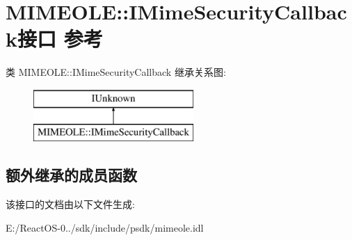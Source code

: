 \hypertarget{interface_m_i_m_e_o_l_e_1_1_i_mime_security_callback}{}\section{M\+I\+M\+E\+O\+LE\+:\+:I\+Mime\+Security\+Callback接口 参考}
\label{interface_m_i_m_e_o_l_e_1_1_i_mime_security_callback}
类 M\+I\+M\+E\+O\+LE\+:\+:I\+Mime\+Security\+Callback 继承关系图\+:\begin{figure}[H]
\begin{center}
\leavevmode
\includegraphics[height=2.000000cm]{interface_m_i_m_e_o_l_e_1_1_i_mime_security_callback}
\end{center}
\end{figure}
\subsection*{额外继承的成员函数}


该接口的文档由以下文件生成\+:\begin{DoxyCompactItemize}
\item 
E\+:/\+React\+O\+S-\/0../sdk/include/psdk/mimeole.\+idl\end{DoxyCompactItemize}
